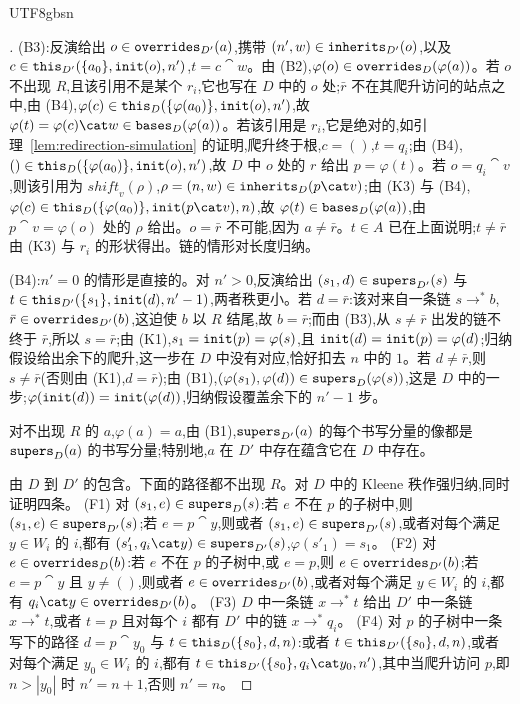 \begin{CJK*}{UTF8}{gbsn}
\begin{proof}[]
\begin{sloppypar}
(B3):反演给出 $o \in \mathtt{overrides}_{D'}(a)$,携带 $(n', w) \in \mathtt{inherits}_{D'}(o)$,以及 $c \in \mathtt{this}_{D'}(\{a_0\}, \mathtt{init}(o), n')$,$t = c \cat w$。由 (B2),$\varphi(o) \in \mathtt{overrides}_D(\varphi(a))$。若 $o$ 不出现 $R$,且该引用不是某个 $r_i$,它也写在 $D$ 中的 $o$ 处;$\bar r$ 不在其爬升访问的站点之中,由 (B4),$\varphi(c) \in \mathtt{this}_D(\{\varphi(a_0)\}, \mathtt{init}(o), n')$,故 $\varphi(t) = \varphi(c) \cat w \in \bases_D(\varphi(a))$。若该引用是 $r_i$,它是绝对的,如引理~\ref{lem:redirection-simulation} 的证明,爬升终于根,$c = ()$,$t = q_i$;由 (B4),$() \in \mathtt{this}_D(\{\varphi(a_0)\}, \mathtt{init}(o), n')$,故 $D$ 中 $o$ 处的 $r$ 给出 $p = \varphi(t)$。若 $o = q_i \cat v$,则该引用为 $\mathit{shift}_v(\rho)$,$\rho = (n, w) \in \inherits_D(p \cat v)$;由 (K3) 与 (B4),$\varphi(c) \in \this_D(\{\varphi(a_0)\}, \init(p \cat v), n)$,故 $\varphi(t) \in \mathtt{bases}_D(\varphi(a))$,由 $p \cat v = \varphi(o)$ 处的 $\rho$ 给出。$o = \bar r$ 不可能,因为 $a \ne \bar r$。$t \in A$ 已在上面说明;$t \ne \bar r$ 由 (K3) 与 $r_i$ 的形状得出。链的情形对长度归纳。

(B4):$n' = 0$ 的情形是直接的。对 $n' > 0$,反演给出 $(s_1, d) \in \mathtt{supers}_{D'}(s)$ 与 $t \in \mathtt{this}_{D'}(\{s_1\}, \mathtt{init}(d), n' - 1)$,两者秩更小。若 $d = \bar r$:该对来自一条链 $s \to^* b$,$\bar r \in \mathtt{overrides}_{D'}(b)$,这迫使 $b$ 以 $R$ 结尾,故 $b = \bar r$;而由 (B3),从 $s \ne \bar r$ 出发的链不终于 $\bar r$,所以 $s = \bar r$;由 (K1),$s_1 = \mathtt{init}(p) = \varphi(s)$,且 $\mathtt{init}(d) = \mathtt{init}(p) = \varphi(d)$;归纳假设给出余下的爬升,这一步在 $D$ 中没有对应,恰好扣去 $n$ 中的 $1$。若 $d \ne \bar r$,则 $s \ne \bar r$(否则由 (K1),$d = \bar r$);由 (B1),$(\varphi(s_1), \varphi(d)) \in \mathtt{supers}_D(\varphi(s))$,这是 $D$ 中的一步;$\varphi(\mathtt{init}(d)) = \mathtt{init}(\varphi(d))$,归纳假设覆盖余下的 $n' - 1$ 步。

对不出现 $R$ 的 $a$,$\varphi(a) = a$,由 (B1),$\mathtt{supers}_{D'}(a)$ 的每个书写分量的像都是 $\mathtt{supers}_D(a)$ 的书写分量;特别地,$a$ 在 $D'$ 中存在蕴含它在 $D$ 中存在。

由 $D$ 到 $D'$ 的包含。下面的路径都不出现 $R$。对 $D$ 中的 Kleene 秩作强归纳,同时证明四条。
(F1) 对 $(s_1, e) \in \mathtt{supers}_D(s)$:若 $e$ 不在 $p$ 的子树中,则 $(s_1, e) \in \mathtt{supers}_{D'}(s)$;若 $e = p \cat y$,则或者 $(s_1, e) \in \mathtt{supers}_{D'}(s)$,或者对每个满足 $y \in W_i$ 的 $i$,都有 $(s'_1, q_i \cat y) \in \supers_{D'}(s)$,$\varphi(s'_1) = s_1$。
(F2) 对 $e \in \mathtt{overrides}_D(b)$:若 $e$ 不在 $p$ 的子树中,或 $e = p$,则 $e \in \mathtt{overrides}_{D'}(b)$;若 $e = p \cat y$ 且 $y \ne ()$,则或者 $e \in \mathtt{overrides}_{D'}(b)$,或者对每个满足 $y \in W_i$ 的 $i$,都有 $q_i \cat y \in \overrides_{D'}(b)$。
(F3) $D$ 中一条链 $x \to^* t$ 给出 $D'$ 中一条链 $x \to^* t$,或者 $t = p$ 且对每个 $i$ 都有 $D'$ 中的链 $x \to^* q_i$。
(F4) 对 $p$ 的子树中一条写下的路径 $d = p \cat y_0$ 与 $t \in \mathtt{this}_D(\{s_0\}, d, n)$:或者 $t \in \mathtt{this}_{D'}(\{s_0\}, d, n)$,或者对每个满足 $y_0 \in W_i$ 的 $i$,都有 $t \in \this_{D'}(\{s_0\}, q_i \cat y_0, n')$,其中当爬升访问 $p$,即 $n > |y_0|$ 时 $n' = n + 1$,否则 $n' = n$。


\end{sloppypar}
\end{proof}
\end{CJK*}
